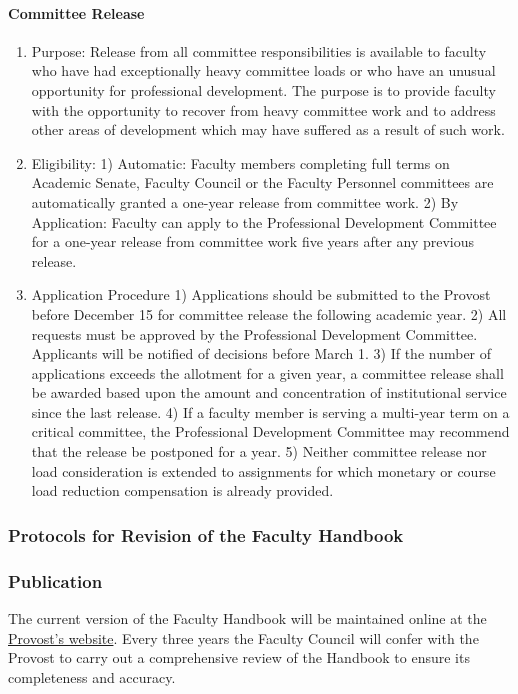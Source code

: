 \documentclass[letterpaper, 11pt]{article}
\begin{document}
			\paragraph{Committee Release}
				\begin{enumerate}[label=\alph*)]
					\item{Purpose:  Release from all committee responsibilities is available to faculty who have had exceptionally heavy committee loads or who have an unusual opportunity for professional development.  The purpose is to provide faculty with the opportunity to recover from heavy committee work and to address other areas of development which may have suffered as a result of such work.}
					\item{Eligibility:}
					1) Automatic:  Faculty members completing full terms on Academic Senate, Faculty Council or the Faculty Personnel committees are automatically granted a one-year release from committee work.
					2) By Application:  Faculty can apply to the Professional Development Committee for a one-year release from committee work five years after any previous release.
					\item{Application Procedure}
					1) Applications should be submitted to the Provost before December 15 for committee release the following academic year.
					2) All requests must be approved by the Professional Development Committee.  Applicants will be notified of decisions before March 1.
					3) If the number of applications exceeds the allotment for a given year, a committee release shall be awarded based upon the amount and concentration of institutional service since the last release.
					4) If a faculty member is serving a multi-year term on a critical committee, the Professional Development Committee may recommend that the release be postponed for a year.
					5) Neither committee release nor load consideration is extended to assignments for which monetary or course load reduction compensation is already provided.
				\end{enumerate}

		\subsubsection{Protocols for Revision of the Faculty Handbook}
		\subsubsection{Publication}
			The current version of the Faculty Handbook will be maintained online at the \href{http://www.westmont.edu/_offices/provost/documents/Faculty-Handbook.pdf}{Provost's website}.  Every three years the Faculty Council will confer with the Provost to carry out a comprehensive review of the Handbook to ensure its completeness and accuracy.
\end{document}
